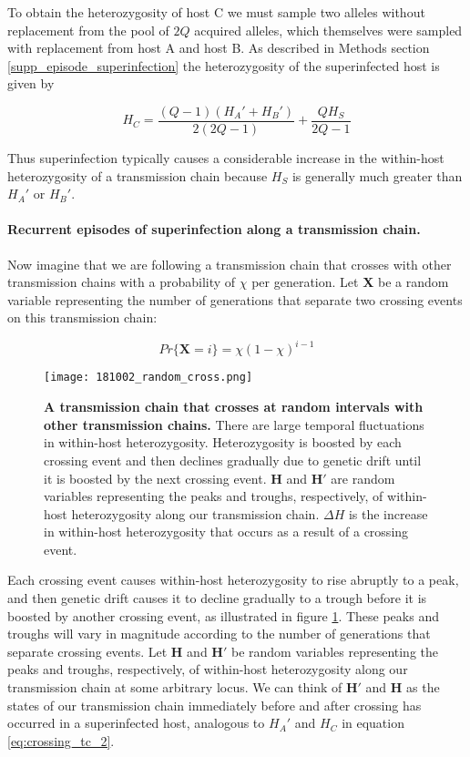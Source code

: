\documentclass[_main.tex]{subfiles}
\begin{document}
To obtain the heterozygosity of host C we must sample two alleles without replacement from the pool of $2Q$ acquired alleles, which themselves were sampled with replacement from host A and host B.  As described in Methods section \ref{supp_episode_superinfection} the heterozygosity of the superinfected host is given by 

\begin{equation}
H_C =
\frac{(Q-1) (H_A' + H_B') }{2(2Q-1)} + \frac{Q H_S}{2Q-1}
\label{eq:crossing_tc_2}
\end{equation}

Thus superinfection typically causes a considerable increase in the within-host heterozygosity of a transmission chain because $H_S$ is generally much greater than $H_A'$ or $H_B'$.  

\paragraph{Recurrent episodes of superinfection along a transmission chain.}  

Now imagine that we are following a transmission chain that crosses with other transmission chains with a probability of $\chi$ per generation.  Let \textbf{X} be a random variable representing the number of generations that separate two crossing events on this transmission chain: 

\begin{equation}
Pr \{ \textbf{X} = i \} = \chi (1- \chi)^{i-1}
\label{eq:main_xprobdist}
\end{equation}

\begin{figure}[h!]
\centering
\texttt{[image: 181002\_random\_cross.png]}
\caption{
\textbf{A transmission chain that crosses at random intervals with other transmission chains.}  There are large temporal fluctuations in within-host heterozygosity.  Heterozygosity is boosted by each crossing event and then declines gradually due to genetic drift until it is boosted by the next crossing event.  $\mathbf{H}$ and  $\mathbf{H'}$ are random variables representing the peaks and troughs, respectively, of within-host heterozygosity along our transmission chain.   $\Delta H$ is the increase in within-host heterozygosity that occurs as a result of a crossing event.
}
\label{fig:tcrand}
\end{figure}

Each crossing event causes within-host heterozygosity to rise abruptly to a peak, and then genetic drift causes it to decline gradually to a trough before it is boosted by another crossing event, as illustrated in figure \ref{fig:tcrand}.  These peaks and troughs will vary in magnitude according to the number of generations that separate crossing events.  Let $\mathbf{H}$ and  $\mathbf{H'}$ be random variables representing the peaks and troughs, respectively, of within-host heterozygosity along our transmission chain at some arbitrary locus.  We can think of $\mathbf{H'}$ and $\mathbf{H}$ as the states of our transmission chain immediately before and after crossing has occurred in a superinfected host, analogous to $H_A'$ and $H_C$ in equation \ref{eq:crossing_tc_2}.  
\end{document}

